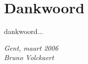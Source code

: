 \documentclass[10pt,a4paper,twoside,dutch,english]{book}                %
\begin{document}

\frontmatter
\chapter{Dankwoord}
\vspace{0.35in}

dankwoord...

\begin{flushright}{\emph{Gent, maart 2006\\
      Bruno Volckaert}}
\end{flushright}

\clearpage{\pagestyle{empty}\cleardoublepage}


\renewcommand{\contentsname}{Table of Contents} %

\tableofcontents
\clearpage{\pagestyle{empty}\cleardoublepage}

\listoffigures
\clearpage{\pagestyle{empty}\cleardoublepage}

\listoftables
\clearpage{\pagestyle{empty}\cleardoublepage}



\clearpage      %
\thispagestyle{empty}   %
\mbox{}         %
\clearpage{\pagestyle{empty}\cleardoublepage}   %


\renewcommand{\bibname}{References}     %




\mainmatter     %
\renewcommand*{\thesection}{\thechapter.\arabic{section}}

\newcommand\fdtsvrightmarktmp{{\scshape\small Chapter }}
\renewcommand\evenpagerightmark{{\scshape\small\chaptername\ \thechapter}}
\renewcommand\oddpageleftmark{{\scshape\small\leftmark}}
\end{document}
